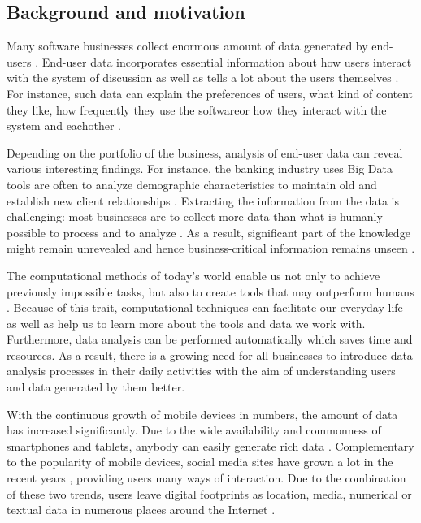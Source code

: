 \subsection{Background and motivation}
    Many software businesses collect enormous amount of data generated by end-users \cite{chinesemobilebankingusers, bigdatamanagementrevolution, inmon2007tapping}. End-user data incorporates essential information about how users interact with the system of discussion as well as tells a lot about the users themselves \cite{jang2015noreciprocity, hu2014we, jang2016teensengagemorewithfewerphotos, han2016teensarefrommars, socialdiversityongithub}. For instance, such data can explain the preferences of users, what kind of content they like, how frequently they use the softwareor how they interact with the system and eachother \cite{youyou2015computer, ottoni2013ladies}.

    Depending on the portfolio of the business, analysis of end-user data can reveal various interesting findings. For instance, the banking industry uses Big Data tools are often to analyze demographic characteristics to maintain old and establish new client relationships \cite{chinesemobilebankingusers, bigdatamanagementrevolution}. Extracting the information from the data is challenging: most businesses are to collect more data than what is humanly possible to process and to analyze \cite{inmon2007tapping, wegener2010integrating}. As a result, significant part of the knowledge might remain unrevealed and hence business-critical information remains unseen \cite{chinesemobilebankingusers, inmon2007tapping, wegener2010integrating, introtodatamining}. 
    
    The computational methods of today's world enable us not only to achieve previously impossible tasks, but also to create tools that may outperform humans \cite{youyou2015computer}. Because of this trait, computational techniques can facilitate our everyday life as well as help us to learn more about the tools and data we work with. Furthermore, data analysis can be performed automatically which saves time and resources. As a result, there is a growing need for all businesses to introduce data analysis processes in their daily activities with the aim of understanding users and data generated by them better.

    With the continuous growth of mobile devices in numbers, the amount of data has increased significantly. Due to the wide availability and commonness of smartphones and tablets, anybody can easily generate rich data \cite{jang2016teensengagemorewithfewerphotos}. Complementary to the popularity of mobile devices, social media sites have grown a lot in the recent years \cite{hu2014we, ottoni2013ladies, bakhshi2014faces}, providing users many ways of interaction. Due to the combination of these two trends, users leave digital footprints as location, media, numerical or textual data in numerous places around the Internet \cite{youyou2015computer}. 
    
